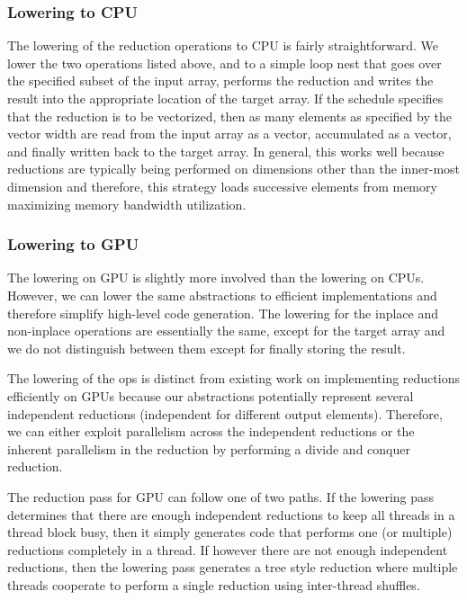 \subsubsection{Lowering to CPU}
The lowering of the reduction operations to CPU is fairly straightforward. We lower the 
two operations listed above,  and 
 to a simple loop nest that goes over the specified
subset of the input array, performs the reduction and writes 
the result into the appropriate location of the target array. 
If the schedule specifies that the reduction is to be vectorized,
then as many elements as specified by the vector width are read 
from the input array as a vector, accumulated as a vector, and 
finally written back to the target array. In general, this works 
well because reductions are typically being performed on dimensions
other than the inner-most dimension and therefore, this strategy
loads successive elements from memory maximizing memory bandwidth 
utilization. 


\subsubsection{Lowering to GPU}
The lowering on GPU is slightly more involved than the lowering on CPUs.
However, we can lower the same abstractions to efficient implementations
and therefore simplify high-level code generation. The lowering for 
the inplace and non-inplace operations are essentially the same, except 
for the target array and we do not distinguish between them except 
for finally storing the result. 

The lowering of the  ops is distinct from existing 
work on implementing reductions efficiently on GPUs \cite{NVIDIAReductions}
because our abstractions potentially represent several independent reductions
(independent for different output elements).
Therefore, we can either exploit parallelism across the independent reductions or 
the inherent parallelism in the reduction by performing a divide and conquer 
reduction.

The reduction pass for GPU can follow one of two paths. If the lowering pass
determines that there are enough independent reductions to keep all threads
in a thread block busy, then it simply generates code that performs one (or 
multiple) reductions completely in a thread. If however there are not 
enough independent reductions, then the lowering pass generates a tree 
style reduction where multiple threads cooperate to perform a single reduction
using inter-thread shuffles.

